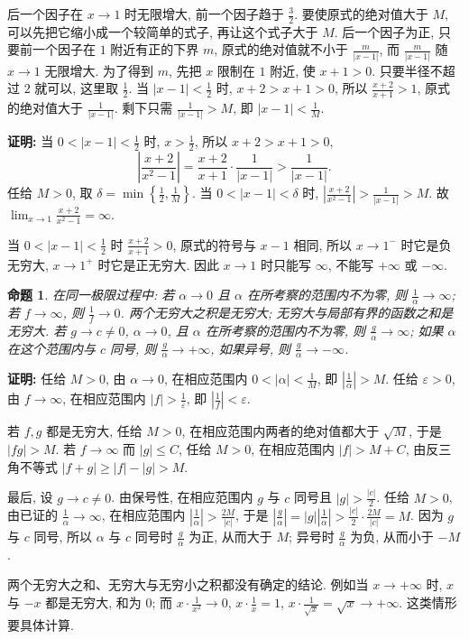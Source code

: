 \documentclass[UTF8,openany]{ctexbook}
\theoremstyle{chinesetextbook}
\newtheorem{proposition}{命题}[section]
\newenvironment{cnproof}{\par\indent\textbf{证明:} \ignorespaces}{\par}
\begin{document}
后一个因子在 $x\to1$ 时无限增大, 前一个因子趋于 $\displaystyle\frac32$. 要使原式的绝对值大于 $M$, 可以先把它缩小成一个较简单的式子, 再让这个式子大于 $M$. 后一个因子为正, 只要前一个因子在 $1$ 附近有正的下界 $m$, 原式的绝对值就不小于 $\displaystyle\frac m{|x-1|}$, 而 $\displaystyle\frac m{|x-1|}$ 随 $x\to1$ 无限增大. 为了得到 $m$, 先把 $x$ 限制在 $1$ 附近, 使 $x+1>0$. 只要半径不超过 $2$ 就可以, 这里取 $\displaystyle\frac12$. 当 $\displaystyle|x-1|<\frac12$ 时, $x+2>x+1>0$, 所以 $\displaystyle\frac{x+2}{x+1}>1$, 原式的绝对值大于 $\displaystyle\frac1{|x-1|}$. 剩下只需 $\displaystyle\frac1{|x-1|}>M$, 即 $\displaystyle|x-1|<\frac1M$.
\begin{cnproof}
当 $\displaystyle0<|x-1|<\frac12$ 时, $\displaystyle x>\frac12$, 所以 $x+2>x+1>0$,
\[
\left|\frac{x+2}{x^2-1}\right|=\frac{x+2}{x+1}\cdot\frac1{|x-1|}>\frac1{|x-1|}.
\]
任给 $M>0$, 取 $\displaystyle\delta=\min\left\{\frac12,\frac1M\right\}$. 当 $0<|x-1|<\delta$ 时, $\displaystyle\left|\frac{x+2}{x^2-1}\right|>\frac1{|x-1|}>M$. 故 $\displaystyle\lim_{x\to1}\frac{x+2}{x^2-1}=\infty$.
\end{cnproof}
当 $\displaystyle0<|x-1|<\frac12$ 时 $\displaystyle\frac{x+2}{x+1}>0$, 原式的符号与 $x-1$ 相同, 所以 $x\to1^-$ 时它是负无穷大, $x\to1^+$ 时它是正无穷大. 因此 $x\to1$ 时只能写 $\infty$, 不能写 $+\infty$ 或 $-\infty$.
\begin{proposition}
在同一极限过程中: 若 $\alpha\to0$ 且 $\alpha$ 在所考察的范围内不为零, 则 $\displaystyle\frac1\alpha\to\infty$; 若 $f\to\infty$, 则 $\displaystyle\frac1f\to0$. 两个无穷大之积是无穷大; 无穷大与局部有界的函数之和是无穷大. 若 $g\to c\ne0$, $\alpha\to0$, 且 $\alpha$ 在所考察的范围内不为零, 则 $\displaystyle\frac g\alpha\to\infty$; 如果 $\alpha$ 在这个范围内与 $c$ 同号, 则 $\displaystyle\frac g\alpha\to+\infty$, 如果异号, 则 $\displaystyle\frac g\alpha\to-\infty$.
\end{proposition}
\begin{cnproof}
任给 $M>0$, 由 $\alpha\to0$, 在相应范围内 $\displaystyle0<|\alpha|<\frac1M$, 即 $\displaystyle\left|\frac1\alpha\right|>M$. 任给 $\varepsilon>0$, 由 $f\to\infty$, 在相应范围内 $\displaystyle|f|>\frac1\varepsilon$, 即 $\displaystyle\left|\frac1f\right|<\varepsilon$.

若 $f,g$ 都是无穷大, 任给 $M>0$, 在相应范围内两者的绝对值都大于 $\sqrt M$, 于是 $|fg|>M$. 若 $f\to\infty$ 而 $|g|\le C$, 任给 $M>0$, 在相应范围内 $|f|>M+C$, 由反三角不等式 $|f+g|\ge|f|-|g|>M$.

最后, 设 $g\to c\ne0$. 由保号性, 在相应范围内 $g$ 与 $c$ 同号且 $\displaystyle|g|>\frac{|c|}2$. 任给 $M>0$, 由已证的 $\displaystyle\frac1\alpha\to\infty$, 在相应范围内 $\displaystyle\left|\frac1\alpha\right|>\frac{2M}{|c|}$, 于是 $\displaystyle\left|\frac g\alpha\right|=|g|\left|\frac1\alpha\right|>\frac{|c|}2\cdot\frac{2M}{|c|}=M$. 因为 $g$ 与 $c$ 同号, 所以 $\alpha$ 与 $c$ 同号时 $\displaystyle\frac g\alpha$ 为正, 从而大于 $M$; 异号时 $\displaystyle\frac g\alpha$ 为负, 从而小于 $-M$.
\end{cnproof}
两个无穷大之和、无穷大与无穷小之积都没有确定的结论. 例如当 $x\to+\infty$ 时, $x$ 与 $-x$ 都是无穷大, 和为 $0$; 而 $\displaystyle x\cdot\frac1{x^2}\to0$, $\displaystyle x\cdot\frac1x=1$, $\displaystyle x\cdot\frac1{\sqrt x}=\sqrt x\to+\infty$. 这类情形要具体计算.
\end{document}
